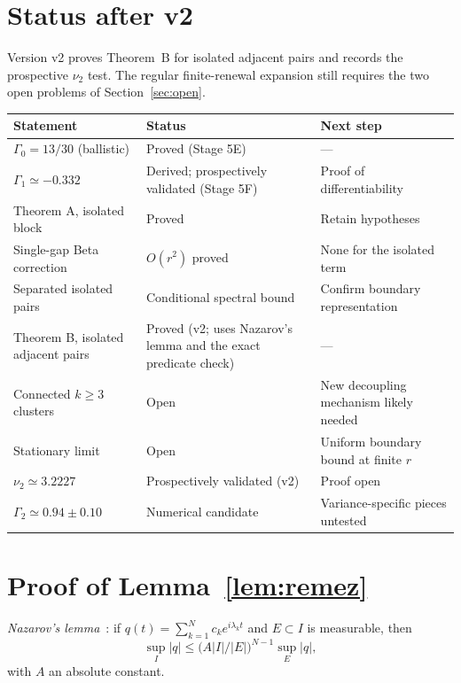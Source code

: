 \documentclass[11pt]{article}
\theoremstyle{remark}\newtheorem{remark}[theorem]{Remark}
\begin{document}
\section*{Status after v2}
Version v2 proves Theorem~B for isolated adjacent pairs and records the prospective $\nu_2$ test. The regular finite-renewal expansion still requires the two open problems of Section~\ref{sec:open}.

\begin{center}\footnotesize
\renewcommand{\arraystretch}{1.12}
\begin{tabularx}{\textwidth}{@{}>{\raggedright\arraybackslash}p{}>{\raggedright\arraybackslash}p{}>{\raggedright\arraybackslash}X@{}}\toprule
Statement & Status & Next step\\\midrule
$\Gamma_0=13/30$ (ballistic) & Proved (Stage 5E) & ---\\
$\Gamma_1\simeq-0.332$ & Derived; prospectively validated (Stage 5F) & Proof of differentiability\\
Theorem A, isolated block & Proved & Retain hypotheses\\
Single-gap Beta correction & $O(r^2)$ proved & None for the isolated term\\
Separated isolated pairs & Conditional spectral bound & Confirm boundary representation\\
Theorem B, isolated adjacent pairs & Proved (v2; uses Nazarov's lemma and the exact predicate check) & ---\\
Connected $k\ge3$ clusters & Open & New decoupling mechanism likely needed\\
Stationary limit & Open & Uniform boundary bound at finite $r$\\
$\nu_2\simeq3.2227$ & Prospectively validated (v2) & Proof open\\
$\Gamma_2\simeq0.94\pm0.10$ & Numerical candidate & Variance-specific pieces untested\\\bottomrule
\end{tabularx}
\end{center}


\appendix
\section{Proof of Lemma~\ref{lem:remez}}\label{app:remez}
\emph{Nazarov's lemma}~\cite{nazarov}: if $q(t)=\sum_{k=1}^{N}c_ke^{i\lambda_kt}$ and $E\subset I$ is measurable, then\[\sup_I|q|\le\bigl(A|I|/|E|\bigr)^{N-1}\sup_E|q|,\]with $A$ an absolute constant.
\end{document}
